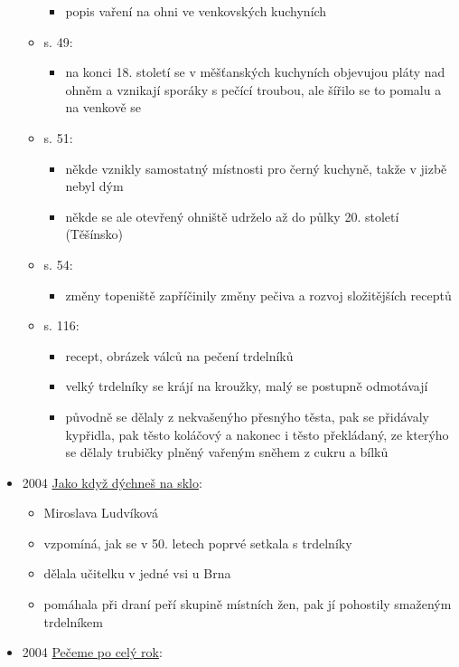 \begin{itemize}
\begin{itemize}
    \begin{itemize}
    \tightlist
    \item
      popis vaření na ohni ve venkovských kuchyních
    \end{itemize}
  \item
    s. 49:

    \begin{itemize}
    \tightlist
    \item
      na konci 18. století se v měšťanských kuchyních objevujou pláty
      nad ohněm a vznikají sporáky s pečící troubou, ale šířilo se to
      pomalu a na venkově se
    \end{itemize}
  \item
    s. 51:

    \begin{itemize}
    \tightlist
    \item
      někde vznikly samostatný místnosti pro černý kuchyně, takže v
      jizbě nebyl dým
    \item
      někde se ale otevřený ohniště udrželo až do půlky 20. století
      (Těšínsko)
    \end{itemize}
  \item
    s. 54:

    \begin{itemize}
    \tightlist
    \item
      změny topeniště zapříčinily změny pečiva a rozvoj složitějších
      receptů
    \end{itemize}
  \item
    s. 116:

    \begin{itemize}
    \tightlist
    \item
      recept, obrázek válců na pečení trdelníků
    \item
      velký trdelníky se krájí na kroužky, malý se postupně odmotávají
    \item
      původně se dělaly z nekvašenýho přesnýho těsta, pak se přidávaly
      kypřidla, pak těsto koláčový a nakonec i těsto překládaný, ze
      kterýho se dělaly trubičky plněný vařeným sněhem z cukru a bílků
    \end{itemize}
  \end{itemize}
\item
  2004
  \href{https://ceskadigitalniknihovna.cz/uuid/uuid:8ad90ef0-1c91-11ed-bb16-005056827e52}{Jako
  když dýchneš na sklo}:

  \begin{itemize}
  \tightlist
  \item
    Miroslava Ludvíková
  \item
    vzpomíná, jak se v 50. letech poprvé setkala s trdelníky
  \item
    dělala učitelku v jedné vsi u Brna
  \item
    pomáhala při draní peří skupině místních žen, pak jí pohostily
    smaženým trdelníkem
  \end{itemize}
\item
  2004
  \href{https://ceskadigitalniknihovna.cz/uuid/uuid:a088d120-1f29-11e6-8803-005056827e51}{Pečeme
  po celý rok}:


\end{itemize}
